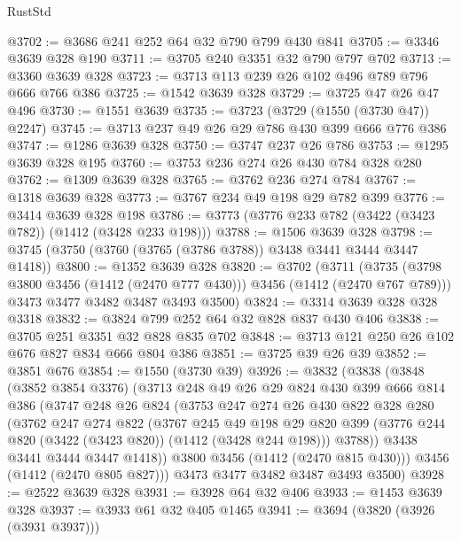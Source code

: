 \begin{lexlean}{RustStd}
\begin{coremodule}
@3702 := @3686 @241 @252 @64 @32 @790 @799 @430 @841
@3705 := @3346 @3639 @328 @190
@3711 := @3705 @240 @3351 @32 @790 @797 @702
@3713 := @3360 @3639 @328
@3723 := @3713 @113 @239 @26 @102 @496 @789 @796 @666 @766 @386
@3725 := @1542 @3639 @328
@3729 := @3725 @47 @26 @47 @496
@3730 := @1551 @3639
@3735 := @3723 (@3729 (@1550 (@3730 @47)) @2247)
@3745 := @3713 @237 @49 @26 @29 @786 @430 @399 @666 @776 @386
@3747 := @1286 @3639 @328
@3750 := @3747 @237 @26 @786
@3753 := @1295 @3639 @328 @195
@3760 := @3753 @236 @274 @26 @430 @784 @328 @280
@3762 := @1309 @3639 @328
@3765 := @3762 @236 @274 @784
@3767 := @1318 @3639 @328
@3773 := @3767 @234 @49 @198 @29 @782 @399
@3776 := @3414 @3639 @328 @198
@3786 := @3773 (@3776 @233 @782 (@3422 (@3423 @782)) (@1412 (@3428 @233 @198)))
@3788 := @1506 @3639 @328
@3798 := @3745 (@3750 (@3760 (@3765 (@3786 @3788)) @3438 @3441 @3444 @3447 @1418))
@3800 := @1352 @3639 @328
@3820 := @3702
    (@3711
      (@3735 (@3798 @3800 @3456 (@1412 (@2470 @777 @430))) @3456 (@1412 (@2470 @767 @789)))
      @3473
      @3477
      @3482
      @3487
      @3493
      @3500)
@3824 := @3314 @3639 @328 @328 @3318
@3832 := @3824 @799 @252 @64 @32 @828 @837 @430 @406
@3838 := @3705 @251 @3351 @32 @828 @835 @702
@3848 := @3713 @121 @250 @26 @102 @676 @827 @834 @666 @804 @386
@3851 := @3725 @39 @26 @39
@3852 := @3851 @676
@3854 := @1550 (@3730 @39)
@3926 := @3832
    (@3838
      (@3848
        (@3852 @3854 @3376)
        (@3713
          @248
          @49
          @26
          @29
          @824
          @430
          @399
          @666
          @814
          @386
          (@3747
            @248
            @26
            @824
            (@3753
              @247
              @274
              @26
              @430
              @822
              @328
              @280
              (@3762
                @247
                @274
                @822
                (@3767
                  @245
                  @49
                  @198
                  @29
                  @820
                  @399
                  (@3776 @244 @820 (@3422 (@3423 @820)) (@1412 (@3428 @244 @198)))
                  @3788))
              @3438
              @3441
              @3444
              @3447
              @1418))
          @3800
          @3456
          (@1412 (@2470 @815 @430)))
        @3456
        (@1412 (@2470 @805 @827)))
      @3473
      @3477
      @3482
      @3487
      @3493
      @3500)
@3928 := @2522 @3639 @328
@3931 := @3928 @64 @32 @406
@3933 := @1453 @3639 @328
@3937 := @3933 @61 @32 @405 @1465
@3941 := @3694 (@3820 (@3926 (@3931 @3937)))

\end{coremodule}
\end{lexlean}

